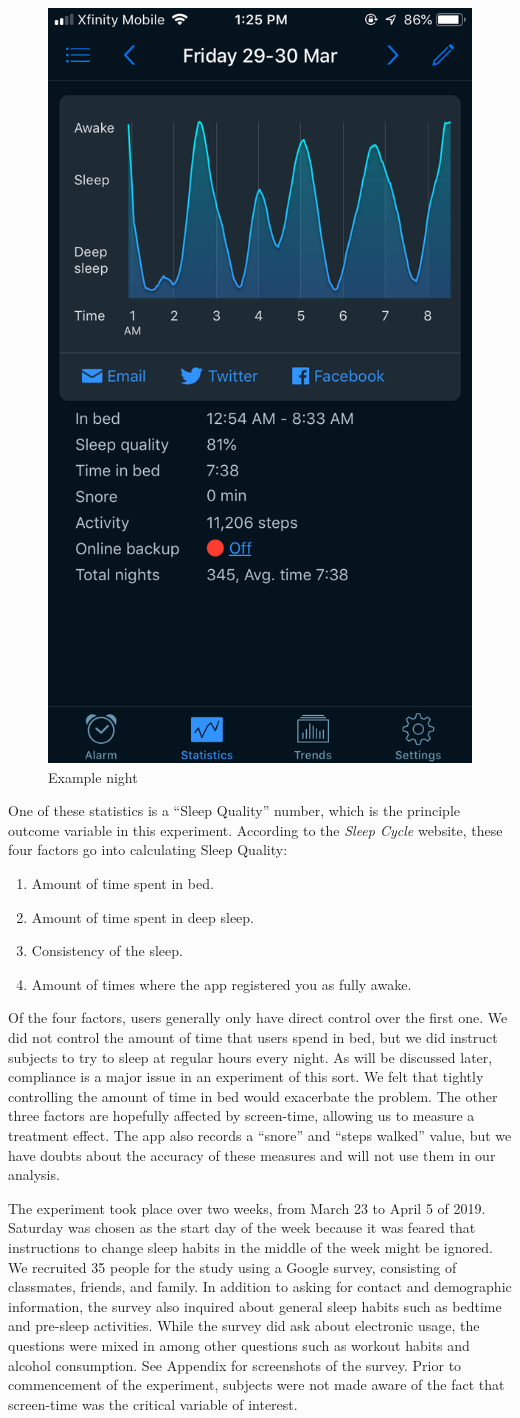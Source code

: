 \documentclass[12pt,]{article}
\providecommand{\tightlist}{%
  \setlength{\itemsep}{0pt}\setlength{\parskip}{0pt}}
\begin{document}
\begin{figure}[H]

{\centering \includegraphics[width=0.25\linewidth]{img/example_night} 

}

\caption{Example night}\label{fig:example_night}
\end{figure}

One of these statistics is a ``Sleep Quality'' number, which is the
principle outcome variable in this experiment. According to the
\emph{Sleep Cycle} website, these four factors go into calculating Sleep
Quality:

\begin{enumerate}
\def\labelenumi{\arabic{enumi}.}
\tightlist
\item
  Amount of time spent in bed.
\item
  Amount of time spent in deep sleep.
\item
  Consistency of the sleep.
\item
  Amount of times where the app registered you as fully awake.
\end{enumerate}

Of the four factors, users generally only have direct control over the
first one. We did not control the amount of time that users spend in
bed, but we did instruct subjects to try to sleep at regular hours every
night. As will be discussed later, compliance is a major issue in an
experiment of this sort. We felt that tightly controlling the amount of
time in bed would exacerbate the problem. The other three factors are
hopefully affected by screen-time, allowing us to measure a treatment
effect. The app also records a ``snore'' and ``steps walked'' value, but
we have doubts about the accuracy of these measures and will not use
them in our analysis.

The experiment took place over two weeks, from March 23 to April 5 of
2019. Saturday was chosen as the start day of the week because it was
feared that instructions to change sleep habits in the middle of the
week might be ignored. We recruited 35 people for the study using a
Google survey, consisting of classmates, friends, and family. In
addition to asking for contact and demographic information, the survey
also inquired about general sleep habits such as bedtime and pre-sleep
activities. While the survey did ask about electronic usage, the
questions were mixed in among other questions such as workout habits and
alcohol consumption. See Appendix for screenshots of the survey. Prior
to commencement of the experiment, subjects were not made aware of the
fact that screen-time was the critical variable of interest.
\end{document}
